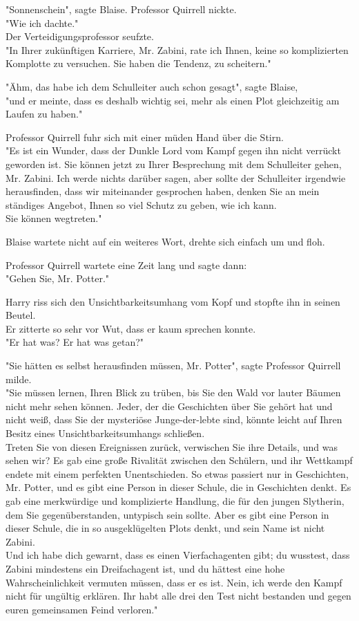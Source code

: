 {"Sonnenschein", sagte Blaise. Professor Quirrell nickte.\\ "Wie ich dachte."\\ Der Verteidigungsprofessor seufzte.\\ "In Ihrer zukünftigen Karriere, Mr. Zabini, rate ich Ihnen, keine so komplizierten Komplotte zu versuchen. Sie haben die Tendenz, zu scheitern."

"Ähm, das habe ich dem Schulleiter auch schon gesagt", sagte Blaise,\\ "und er meinte, dass es deshalb wichtig sei, mehr als einen Plot gleichzeitig am Laufen zu haben."

Professor Quirrell fuhr sich mit einer müden Hand über die Stirn.\\ "Es ist ein Wunder, dass der Dunkle Lord vom Kampf gegen ihn nicht verrückt geworden ist. Sie können jetzt zu Ihrer Besprechung mit dem Schulleiter gehen, Mr. Zabini. Ich werde nichts darüber sagen, aber sollte der Schulleiter irgendwie herausfinden, dass wir miteinander gesprochen haben, denken Sie an mein ständiges Angebot, Ihnen so viel Schutz zu geben, wie ich kann.\\ Sie können wegtreten."

Blaise wartete nicht auf ein weiteres Wort, drehte sich einfach um und floh.

Professor Quirrell wartete eine Zeit lang und sagte dann:\\ "Gehen Sie, Mr. Potter."

Harry riss sich den Unsichtbarkeitsumhang vom Kopf und stopfte ihn in seinen Beutel.\\ Er zitterte so sehr vor Wut, dass er kaum sprechen konnte.\\ "Er hat was? Er hat was getan?"

"Sie hätten es selbst herausfinden müssen, Mr. Potter", sagte Professor Quirrell milde.\\ "Sie müssen lernen, Ihren Blick zu trüben, bis Sie den Wald vor lauter Bäumen nicht mehr sehen können. Jeder, der die Geschichten über Sie gehört hat und nicht weiß, dass Sie der mysteriöse Junge-der-lebte sind, könnte leicht auf Ihren Besitz eines Unsichtbarkeitsumhangs schließen.\\ Treten Sie von diesen Ereignissen zurück, verwischen Sie ihre Details, und was sehen wir? Es gab eine große Rivalität zwischen den Schülern, und ihr Wettkampf endete mit einem perfekten Unentschieden. So etwas passiert nur in Geschichten, Mr. Potter, und es gibt eine Person in dieser Schule, die in Geschichten denkt. Es gab eine merkwürdige und komplizierte Handlung, die für den jungen Slytherin, dem Sie gegenüberstanden, untypisch sein sollte. Aber es gibt eine Person in dieser Schule, die in so ausgeklügelten Plots denkt, und sein Name ist nicht Zabini.\\ Und ich habe dich gewarnt, dass es einen Vierfachagenten gibt; du wusstest, dass Zabini mindestens ein Dreifachagent ist, und du hättest eine hohe Wahrscheinlichkeit vermuten müssen, dass er es ist. Nein, ich werde den Kampf nicht für ungültig erklären. Ihr habt alle drei den Test nicht bestanden und gegen euren gemeinsamen Feind verloren."

}
